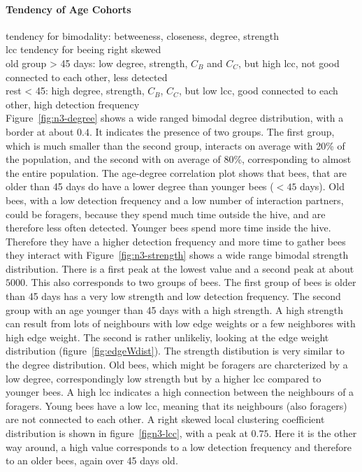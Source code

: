 \paragraph{Tendency of Age Cohorts}
tendency for bimodality: betweeness, closeness, degree, strength\\
lcc tendency for beeing right skewed\\
old group > 45 days: low degree, strength, $C_B$ and $C_C$, but high lcc, not good connected to each other, less detected\\
rest < 45: high degree, strength, $C_B$, $C_C$, but low lcc, good connected to each other, high detection frequency\\
Figure~\ref{fig:n3-degree} shows a wide ranged bimodal degree distribution, with a border at about $0.4$. It indicates the presence of two groups.
The first group, which is much smaller than the second group, interacts on average with 20\% of the population, and the second with on average of 80\%, corresponding to almost the entire population.
The age-degree correlation plot shows that bees, that are older than 45 days do have a lower degree than younger bees ($< 45$ days).
Old bees, with a low detection frequency and a low number of interaction partners, could be foragers, because they spend much time outside the hive, and are therefore less often detected. Younger bees spend more time inside the hive. Therefore they have a higher detection frequency and more time to gather bees they interact with
Figure~\ref{fig:n3-strength} shows a wide range bimodal strength distribution. There is a first peak at the lowest value and a second peak at about $5000$. This also corresponds to two groups of bees. The first group of bees is older than 45 days has a very low strength and low detection frequency. The second group with an age younger than 45 days with a high strength.
A high strength can result from lots of neighbours with low edge weights or a few neighbores with high edge weight. The second is rather unlikeliy, looking at the edge weight distribution (figure~\ref{fig:edgeWdist}). The strength distibution is very similar to the degree distribution.
Old bees, which might be foragers are charcterized by a low degree, correspondingly low strength but by a higher lcc compared to younger bees. A high lcc indicates a high connection between the neighbours of a foragers. Young bees have a low lcc, meaning that its neighbours (also foragers) are not connected to each other.
A right skewed local clustering coefficient distribution is shown in figure~\ref{fign3-lcc}, with a peak at $0.75$.
Here it is the other way around, a high value corresponds to a low detection frequency and therefore to an older bees, again over 45 days old.



